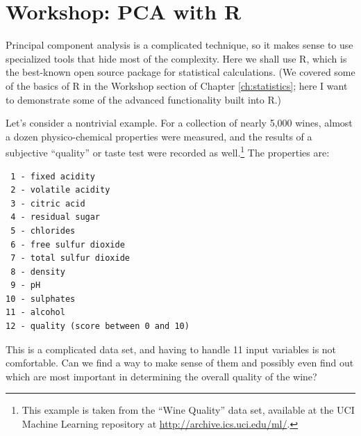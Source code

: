 

% 
% 


\section{Workshop: PCA with R}

 
Principal component analysis is a complicated technique, so it makes
sense to use specialized tools that hide most of the complexity.  Here
we shall use R, which is the best-known open source package for
statistical calculations. (We covered some of the basics of R in the
Workshop section of Chapter \ref{ch:statistics}; here I want to
demonstrate some of the advanced functionality built into R.)

Let's consider a nontrivial example. For a collection of nearly 5,000
wines, almost a dozen physico-chemical properties were measured, and
the results of a subjective ``quality'' or taste test were recorded as
well.\footnote{This example is taken from the ``Wine Quality'' data
  set, available at the UCI Machine Learning repository at
  \url{http://archive.ics.uci.edu/ml/}.}  The
properties are:

\begin{verbatim}
 1 - fixed acidity 
 2 - volatile acidity 
 3 - citric acid 
 4 - residual sugar 
 5 - chlorides 
 6 - free sulfur dioxide 
 7 - total sulfur dioxide 
 8 - density 
 9 - pH 
10 - sulphates 
11 - alcohol 
12 - quality (score between 0 and 10)
\end{verbatim}

This is a complicated data set, and having to handle 11 input
variables is not comfortable. Can we find a way to make sense of them
and possibly even find out which are most important in determining the
overall quality of the wine?

